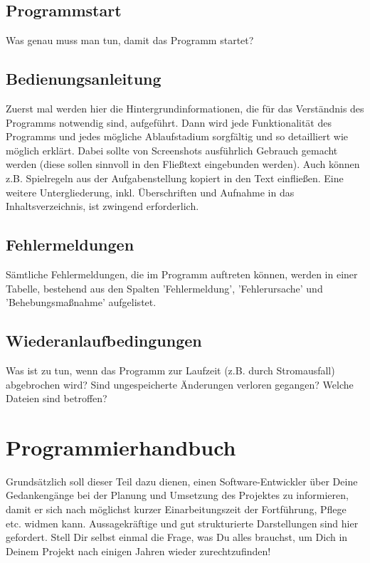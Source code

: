 \documentclass[12pt, letterpaper, twoside]{article}
\begin{document}
        \subsection{Programmstart}
            Was genau muss man tun, damit das Programm startet?

        \subsection{Bedienungsanleitung}
            Zuerst mal werden hier die Hintergrundinformationen, die für das Verständnis des Programms notwendig sind, aufgeführt. Dann wird jede Funktionalität des Programms und jedes mögliche Ablaufstadium sorgfältig und so detailliert wie möglich erklärt. Dabei sollte von Screenshots ausführlich Gebrauch gemacht werden (diese sollen sinnvoll in den Fließtext eingebunden werden). Auch können z.B. Spielregeln aus der Aufgabenstellung kopiert in den Text einfließen. Eine weitere Untergliederung, inkl. Überschriften und Aufnahme in das Inhaltsverzeichnis, ist zwingend erforderlich.

        \subsection{Fehlermeldungen}
            Sämtliche Fehlermeldungen, die im Programm auftreten können, werden in einer Tabelle, bestehend aus den Spalten 'Fehlermeldung', 'Fehlerursache' und 'Behebungsmaßnahme' aufgelistet.

        \subsection{Wiederanlaufbedingungen}
            Was ist zu tun, wenn das Programm zur Laufzeit (z.B. durch Stromausfall) abgebrochen wird? Sind ungespeicherte Änderungen verloren gegangen? Welche Dateien sind betroffen?
    \newpage

    \section{Programmierhandbuch}
        Grundsätzlich soll dieser Teil dazu dienen, einen Software-Entwickler über Deine Gedankengänge bei der Planung und Umsetzung des Projektes zu informieren, damit er sich nach möglichst kurzer Einarbeitungszeit der Fortführung, Pflege etc. widmen kann. Aussagekräftige und gut strukturierte Darstellungen sind hier gefordert. Stell Dir selbst einmal die Frage, was Du alles brauchst, um Dich in Deinem Projekt nach einigen Jahren wieder zurechtzufinden!
\end{document}
